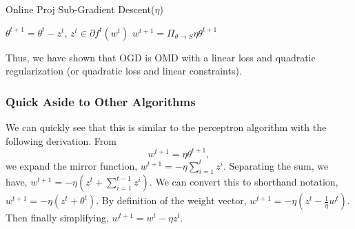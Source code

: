 \documentclass[11pt]{article}
\begin{document}
\begin{algorithm}
\caption{Online Proj Sub-Gradient Descent($\eta$)}
\label{alg:OPSGS}
\begin{algorithmic}[1]
        \STATE $\theta^{t+1} = \theta^t - z^t$, $z^t \in \partial f^t(w^t)$
        \STATE $w^{t+1} = \Pi_{\theta \to S} \eta \theta^{t+1}$
    \ENDFOR
\end{algorithmic}
\end{algorithm}

Thus, we have shown that OGD is OMD with a linear loss and quadratic regularization (or quadratic loss and linear constraints).

\subsubsection{Quick Aside to Other Algorithms}
We can quickly see that this is similar to the perceptron algorithm with the following derivation.
From $$ w^{t+1} = \eta \theta^{t+1},$$ we expand the mirror function,
$
w^{t+1} = -\eta \sum_{i=1}^t z^i.
$
Separating the sum, we have,
$
w^{t+1} = -\eta (z^t + \sum_{i=1}^{t-1} z^i).
$
We can convert this to shorthand notation,
$
w^{t+1} = -\eta (z^t + \theta^t).
$
By definition of the weight vector,
$
w^{t+1} = -\eta (z^t - \frac{1}{\eta} w^t).
$
Then finally simplifying,
$
w^{t+1} = w^t - \eta z^t.
$
\end{document}
